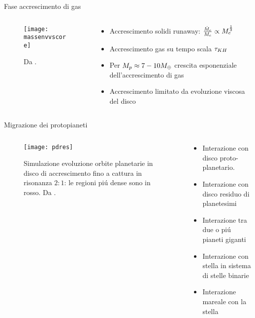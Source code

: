 \begin{frame}{Fase accrescimento di gas}
\begin{columns}[T]
	\begin{column}{0.5\textwidth}
		\begin{figure}[!ht]
			\texttt{[image: massenvvscore]}
			\caption{Da \cite{alibert2005models}.}\label{fig:massenvvscore}
		\end{figure}
	\end{column}
	\begin{column}{0.5\textwidth}
\begin{itemize}
	\item Accrescimento solidi runaway: $\frac{\dot{M}_e}{M_e}\propto M_e^{\frac{1}{3}}$
	\item Accrescimento gas su tempo scala $\tau_{KH}{}$
	\item Per $M_p\approx7-10M_{\oplus}{}$ crescita esponenziale dell'accrescimento di gas
	\item Accrescimento limitato da evoluzione viscosa del disco
\end{itemize}
\end{column}
\end{columns}
\end{frame}

\begin{frame}{Migrazione dei protopianeti}
\begin{columns}[T]
	\begin{column}{0.5\textwidth}
\begin{figure}[!ht]
	\texttt{[image: pdres]}
	\caption{Simulazione evoluzione orbite planetarie in disco di accrescimento fino a cattura in risonanza $2:1$: le regioni pi\'u dense sono in rosso. Da \cite{kley2012planet}.}\label{fig:pdres}
\end{figure}
	\end{column}
\begin{column}{0.5\textwidth}
\begin{itemize}
	\item Interazione con disco proto-planetario. 
	\item Interazione con disco residuo di planetesimi
	\item Interazione tra due o pi\'u pianeti giganti
	\item Interazione con stella in sistema di stelle binarie
	\item Interazione mareale con la stella
\end{itemize}
\end{column}
\end{columns}
\end{frame}

